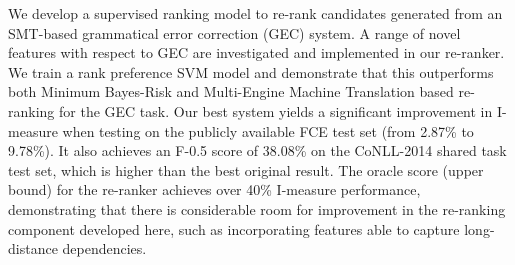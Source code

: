 We develop a supervised ranking model to re-rank candidates generated from an SMT-based grammatical error correction (GEC) system. A range of novel features with respect to GEC are investigated and implemented in our re-ranker. We train a rank preference SVM model and demonstrate that this outperforms both Minimum Bayes-Risk and Multi-Engine Machine Translation based re-ranking for the GEC task. Our best system yields a significant improvement in I-measure when testing on the publicly available FCE test set (from 2.87\% to 9.78\%). It also achieves an F-0.5 score of 38.08\% on the CoNLL-2014 shared task test set, which is higher than the best original result. The oracle score (upper bound) for the re-ranker achieves over 40\% I-measure performance, demonstrating that there is considerable room for improvement in the re-ranking component developed here, such as incorporating features able to capture long-distance dependencies.
